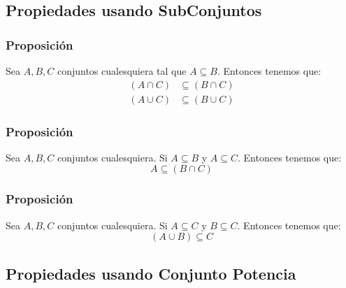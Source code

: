 \documentclass[12pt]{report}                                    %
\begin{document}
            \subsection{Propiedades usando SubConjuntos}
                
                \subsubsection{Proposición}
                    Sea $A, B, C$ conjuntos cualesquiera tal que $A \subseteq B$. Entonces tenemos que:
                    \begin{equation*}
                    \begin{split}
                        (A \cap C) &\subseteq (B \cap C)        \\
                        (A \cup C) &\subseteq (B \cup C)
                    \end{split}
                    \end{equation*}

                \subsubsection{Proposición}
                    Sea $A, B, C$ conjuntos cualesquiera. Si $A \subseteq B$ y $A \subseteq C$.
                    Entonces tenemos que:
                    \begin{equation*}
                        A \subseteq (B \cap C)
                    \end{equation*}

                \subsubsection{Proposición}
                    Sea $A, B, C$ conjuntos cualesquiera. Si $A \subseteq C$ y $B \subseteq C$.
                    Entonces tenemos que:
                    \begin{equation*}
                        (A \cup B) \subseteq C
                    \end{equation*}


            \clearpage
            \subsection{Propiedades usando Conjunto Potencia}
                
\end{document}
